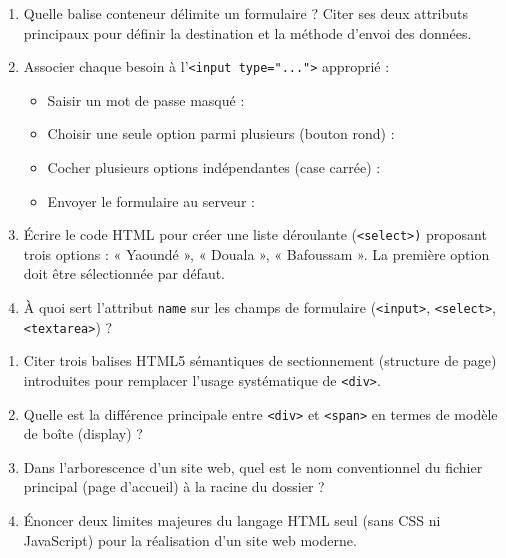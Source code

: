 \documentclass[11pt]{article}
\begin{document}
\begin{exercice}
\begin{enumerate}
    \item Quelle balise conteneur délimite un formulaire ? Citer ses deux attributs principaux pour définir la destination et la méthode d'envoi des données.
    \item Associer chaque besoin à l'\texttt{<input type="...">} approprié :
    \begin{itemize}
        \item Saisir un mot de passe masqué : \underline{\hspace{4cm}}
        \item Choisir une seule option parmi plusieurs (bouton rond) : \underline{\hspace{4cm}}
        \item Cocher plusieurs options indépendantes (case carrée) : \underline{\hspace{4cm}}
        \item Envoyer le formulaire au serveur : \underline{\hspace{4cm}}
    \end{itemize}
    \item Écrire le code HTML pour créer une liste déroulante (\texttt{<select>)} proposant trois options : « Yaoundé », « Douala », « Bafoussam ». La première option doit être sélectionnée par défaut.
    \item À quoi sert l'attribut \texttt{name} sur les champs de formulaire (\texttt{<input>}, \texttt{<select>}, \texttt{<textarea>}) ?
\end{enumerate}
\end{exercice}

\begin{exercice}
\begin{enumerate}
    \item Citer trois balises HTML5 sémantiques de sectionnement (structure de page) introduites pour remplacer l'usage systématique de \texttt{<div>}.
    \item Quelle est la différence principale entre \texttt{<div>} et \texttt{<span>} en termes de modèle de boîte (display) ?
    \item Dans l'arborescence d'un site web, quel est le nom conventionnel du fichier principal (page d'accueil) à la racine du dossier ?
    \item Énoncer deux limites majeures du langage HTML seul (sans CSS ni JavaScript) pour la réalisation d'un site web moderne.
\end{enumerate}
\end{exercice}
\end{document}
